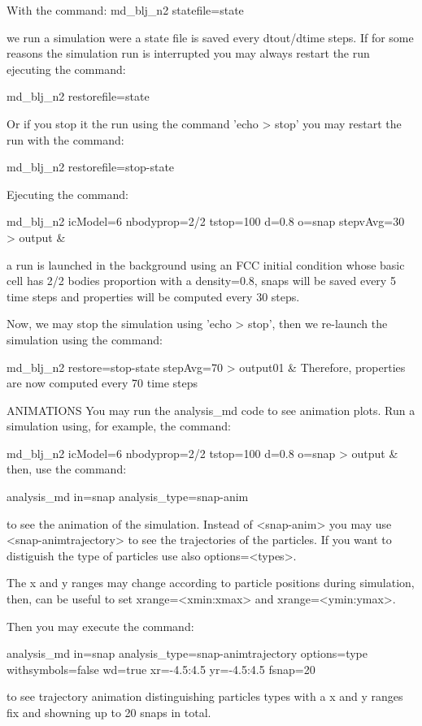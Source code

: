        With the command: md_blj_n2 statefile=state

       we run a simulation were a state file is saved every dtout/dtime steps. If for some reasons the simulation run
       is interrupted you may always restart the run ejecuting the command:

       md_blj_n2 restorefile=state

       Or if you stop it the run using the command 'echo > stop' you may restart the run with the command:

       md_blj_n2 restorefile=stop-state

       Ejecuting the command:

       md_blj_n2 icModel=6 nbodyprop=2/2 tstop=100 d=0.8 o=snap stepvAvg=30 > output &

       a run is launched in the background using an FCC initial condition whose basic cell has 2/2 bodies proportion
       with a density=0.8, snaps will be saved every 5 time steps and properties will be computed every 30 steps.

       Now, we may stop the simulation using 'echo > stop', then we re-launch the simulation using the command:

       md_blj_n2 restore=stop-state stepAvg=70 > output01 & Therefore, properties are now computed every 70 time steps


ANIMATIONS
       You may run the analysis_md code to see animation plots.  Run a simulation using, for example, the command:

       md_blj_n2 icModel=6 nbodyprop=2/2 tstop=100 d=0.8 o=snap > output &
       then, use the command:

       analysis_md in=snap analysis_type=snap-anim

       to see the animation of the simulation. Instead of <snap-anim> you may use <snap-animtrajectory> to see the
       trajectories of the particles.  If you want to distiguish the type of particles use also options=<types>.

       The x and y ranges may change according to particle positions during simulation, then, can be useful to set
       xrange=<xmin:xmax> and xrange=<ymin:ymax>.

       Then you may execute the command:

       analysis_md in=snap analysis_type=snap-animtrajectory options=type withsymbols=false wd=true xr=-4.5:4.5
       yr=-4.5:4.5 fsnap=20

       to see trajectory animation distinguishing particles types with a x and y ranges fix and showning up to 20 snaps
       in total.
